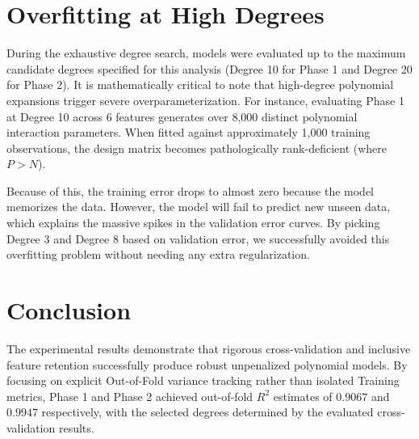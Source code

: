 \documentclass[11pt,a4paper]{article}
\begin{document}
\section{Overfitting at High Degrees}
During the exhaustive degree search, models were evaluated up to the maximum candidate degrees specified for this analysis (Degree 10 for Phase 1 and Degree 20 for Phase 2). It is mathematically critical to note that high-degree polynomial expansions trigger severe overparameterization. For instance, evaluating Phase 1 at Degree 10 across 6 features generates over 8,000 distinct polynomial interaction parameters. When fitted against approximately 1,000 training observations, the design matrix becomes pathologically rank-deficient (where $P > N$).

Because of this, the training error drops to almost zero because the model memorizes the data. However, the model will fail to predict new unseen data, which explains the massive spikes in the validation error curves. By picking Degree 3 and Degree 8 based on validation error, we successfully avoided this overfitting problem without needing any extra regularization.

\section{Conclusion}
The experimental results demonstrate that rigorous cross-validation and inclusive feature retention successfully produce robust unpenalized polynomial models. By focusing on explicit Out-of-Fold variance tracking rather than isolated Training metrics, Phase 1 and Phase 2 achieved out-of-fold $R^2$ estimates of $0.9067$ and $0.9947$ respectively, with the selected degrees determined by the evaluated cross-validation results.
\end{document}
